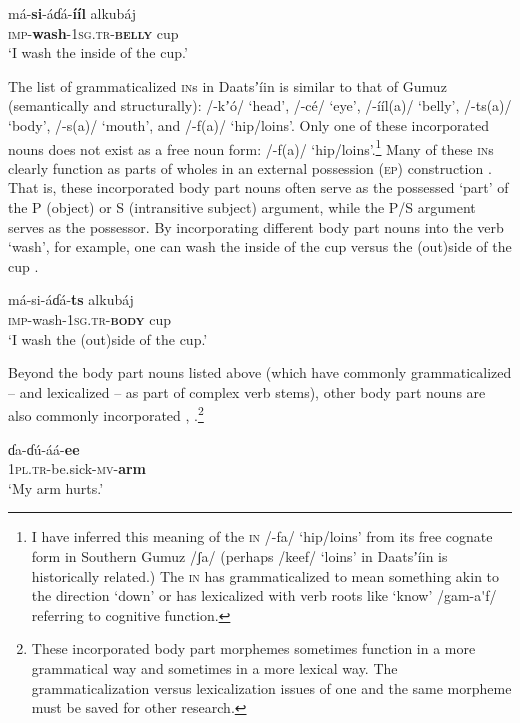 \documentclass[output=paper]{langsci/langscibook}
\begin{document}
\ea\label{ex:ahlandc:11}
\gll 
má-\textbf{si}{}-áɗá-\textbf{ííl}  alkubáj \\
\textsc{imp}{}-\textbf{wash}{}-\textsc{1sg.tr-}\textbf{\textsc{belly}}     cup \\
\glt
‘I wash the inside of the cup.’
\z

The list of grammaticalized \textsc{in}s in Daatsʼíin is  similar to that of Gumuz (semantically and structurally): /-kʼ\'{o}/ ‘head’, /-cé/ ‘eye’, /-ííl(a)/ ‘belly’, /-ts(a)/ ‘body’, /-s(a)/ ‘mouth’, and /-f(a)/ ‘hip/loins’. Only one of these incorporated nouns does not exist as a free noun form: /-f(a)/ ‘hip/loins’.\footnote{ I have inferred this meaning of the \textsc{in }/-fa/ ‘hip/loins’ from its free cognate form in Southern Gumuz /ʃa/ (perhaps /keef/ ‘loins’ in Daatsʼíin is historically related.) The \textsc{in }has grammaticalized to mean something akin to the direction ‘down’ or has lexicalized with verb roots like ‘know’ /gam-a\'{ }f/ referring to cognitive function.} Many of these \textsc{in}s clearly function as parts of wholes in an external possession (\textsc{ep}) construction \citep{PayneBarshi1999}. That is, these incorporated body part nouns often serve as the possessed ‘part’ of the P (object) or S (intransitive subject) argument, while the P/S argument serves as the possessor. By incorporating different body part nouns into the verb ‘wash’, for example, one can wash the inside of the cup  versus the (out)side of the cup .  

\ea\label{ex:ahlandc:12}
\gll
má-si-áɗá-\textbf{ts}    alkubáj \\
\textsc{imp}{}-wash{}-\textsc{1sg.tr-}\textbf{\textsc{body}}   cup \\
\glt
‘I wash the (out)side of the cup.’
\z

Beyond the body part nouns listed above (which have commonly grammaticalized – and lexicalized – as part of complex verb stems), other body part nouns are also commonly incorporated , .\footnote{These incorporated body part morphemes sometimes function in a more grammatical way and sometimes in a more lexical way. The grammaticalization versus lexicalization issues of one and the same morpheme must be saved for other research.}

\ea\label{ex:ahlandc:13}
\gll
ɗa-ɗ\'{u}-áá-\textbf{ee}   \\
\textsc{1pl.tr}{}-be.sick-\textsc{mv}{}-\textbf{arm} \\
\glt
‘My arm hurts.’
\z
\end{document}
